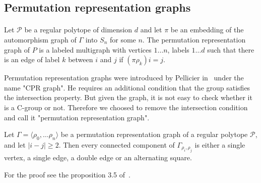 \subsection{Permutation representation graphs}

\paragraph{}

\begin{definition}
  Let $\mathcal P$ be a regular polytope of dimension $d$ and let $\pi$ be an embedding of the automorphism graph of $\Gamma$ into $S_n$ for some $n$. The permutation representation graph of $P$ is a labeled multigraph with vertices ${1 \dots n}$, labels ${1 \dots d}$ such that there is an edge of label $k$ between $i$ and $j$ if $(\pi \rho_k)i = j$.
\end{definition}

Permutation representation graphs were introduced by Pellicier in~\cite{cprGraph} under the name "CPR graph". He requires an additional condition that the group satisfies the intersection property. But given the graph, it is not easy to check whether it is a C-group or not. Therefore we choosed to remove the intersection condition and call it "permutation representation graph".

\begin{property}
  \label{intersection-patterns}
  Let $\Gamma = \langle \rho_0, \dots \rho_n \rangle$ be a permutation representation graph of a regular polytope $\mathcal P$, and let $|i - j| \ge 2$. Then every connected component of $\Gamma_{\rho_i,\rho_j}$ is either a single vertex, a single edge, a double edge or an alternating square.
\end{property}

For the proof see the proposition 3.5 of~\cite{cprGraph}.
